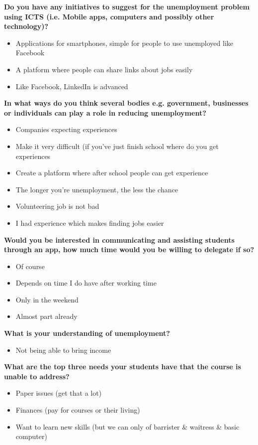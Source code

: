 

\noindent\textbf{Do you have any initiatives to suggest for the unemployment problem using ICTS (i.e. Mobile apps, computers and possibly other technology)?}
\begin{itemize}
\item Applications for smartphones, simple for people to use unemployed like Facebook
\item A platform where people can share links about jobs easily
\item Like Facebook, LinkedIn is advanced
\end{itemize}

\noindent\textbf{In what ways do you think several bodies e.g. government, businesses or individuals can play a role in reducing unemployment?}
\begin{itemize}
\item Companies expecting experiences
\item Make it very difficult (if you’ve just finish school where do you get experiences
\item Create a platform where after school people can get experience
\item The longer you’re unemployment, the less the chance
\item Volunteering job is not bad
\item I had experience which makes finding jobs easier
\end{itemize}

\noindent\textbf{Would you be interested in communicating and assisting students through an app, how much time would you be willing to delegate if so?}
\begin{itemize}
\item Of course
\item Depends on time I do have after working time
\item Only in the weekend
\item Almost part already
\end{itemize}

\noindent\textbf{What is your understanding of unemployment?}
\begin{itemize}
\item Not being able to bring income
\end{itemize}

\noindent\textbf{What are the top three needs your students have that the course is unable to address?}
\begin{itemize}
\item Paper issues (get that a lot)
\item Finances (pay for courses or their living)
\item Want to learn new skills (but we can only of barrister \& waitress \& basic computer)
\end{itemize}

